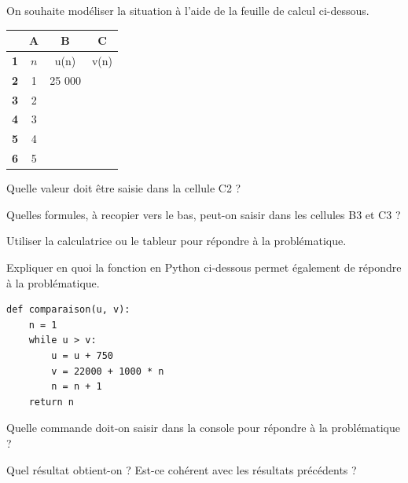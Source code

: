 \documentclass[12pt,a4paper]{book}
\begin{document}
\begin{enumMet}
	\item On souhaite modéliser la situation à l'aide de la feuille de calcul ci-dessous.

\begin{center}
\begin{tabular}{|c|c|c|c|}
	\hline
	 & \textbf{A} & \textbf{B} & \textbf{C} \\
	\hline
	\textbf{1} & $n$ & u(n) & v(n) \\
	\hline
	\textbf{2} & 1 & 25 000 & \\
	\hline
	\textbf{3} & 2 & & \\
	\hline
	\textbf{4} & 3 & & \\
	\hline
	\textbf{5} & 4 & & \\
	\hline
	\textbf{6} & 5 & & \\
	\hline
\end{tabular}
\end{center}

	\begin{enumMet}
		\item Quelle valeur doit être saisie dans la cellule C2 ?
		\item Quelles formules, à recopier vers le bas, peut-on saisir dans les cellules B3 et C3 ?
		\item Utiliser la calculatrice ou le tableur pour répondre à la problématique.
	\end{enumMet}
	\item \begin{enumMet}
		\item Expliquer en quoi la fonction en Python ci-dessous permet également de répondre à la problématique.

\begin{center}
\begin{minipage}{0.65\linewidth}
\begin{verbatim}
def comparaison(u, v):
    n = 1
    while u > v:
        u = u + 750
        v = 22000 + 1000 * n
        n = n + 1
    return n
\end{verbatim}
\end{minipage}
\end{center}

		\item Quelle commande doit-on saisir dans la console pour répondre à la problématique ?
		\item Quel résultat obtient-on ? Est-ce cohérent avec les résultats précédents ?
	\end{enumMet}
\end{enumMet}
\end{document}

